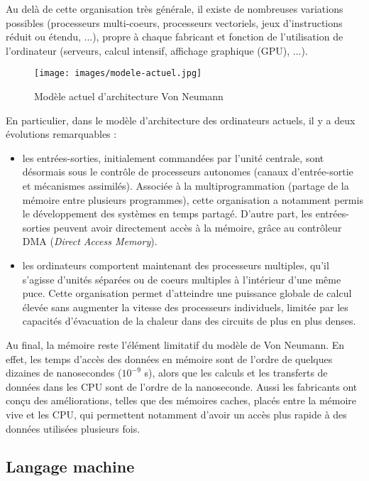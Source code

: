 \documentclass[11pt,a4paper,french,twoside]{PMCours}
\begin{document}
Au delà de cette organisation très générale, il existe de nombreuses variations possibles (processeurs multi-coeurs, processeurs vectoriels, jeux d'instructions réduit ou étendu, ...), propre à chaque fabricant et fonction de l'utilisation de l'ordinateur (serveurs, calcul intensif,  affichage graphique (GPU), ...).
\begin{center}
\begin{figure}[ht]
\centering
\texttt{[image: images/modele-actuel.jpg]}
 \caption{Modèle actuel d'architecture Von Neumann}
\end{figure}
\end{center}
En particulier, dans le modèle d'architecture des ordinateurs actuels, il y a deux évolutions remarquables :
\begin{itemize}
 \item les entrées-sorties, initialement commandées par l’unité centrale, sont désormais sous le contrôle de processeurs autonomes (canaux d’entrée-sortie et mécanismes assimilés). Associée à la multiprogrammation (partage de la mémoire entre plusieurs programmes), cette organisation a notamment permis le développement des systèmes en temps partagé. D'autre part, les entrées-sorties peuvent avoir directement accès à la mémoire, grâce au contrôleur DMA (\emph{Direct Access Memory}).
 \item les ordinateurs comportent maintenant des processeurs multiples, qu’il s’agisse d’unités séparées ou de coeurs multiples à l’intérieur d’une même puce. Cette organisation permet d’atteindre une puissance globale de calcul élevée sans augmenter la vitesse des processeurs individuels, limitée par les capacités d’évacuation de la chaleur dans des circuits de plus en plus denses.
\end{itemize}

Au final, la mémoire reste l'élément limitatif du modèle de Von Neumann. En effet, les temps d'accès des données en mémoire sont de l'ordre de quelques dizaines de nanosecondes ($10^{-9}$ s), alors que les calculs et les transferts de données dans les CPU sont de l'ordre de la nanoseconde. Aussi les fabricants ont conçu des améliorations, telles que des mémoires caches, placés entre la mémoire vive et les CPU, qui permettent notamment d'avoir un accès plus rapide à des données utilisées plusieurs fois.




\subsection{Langage machine}
\end{document}
